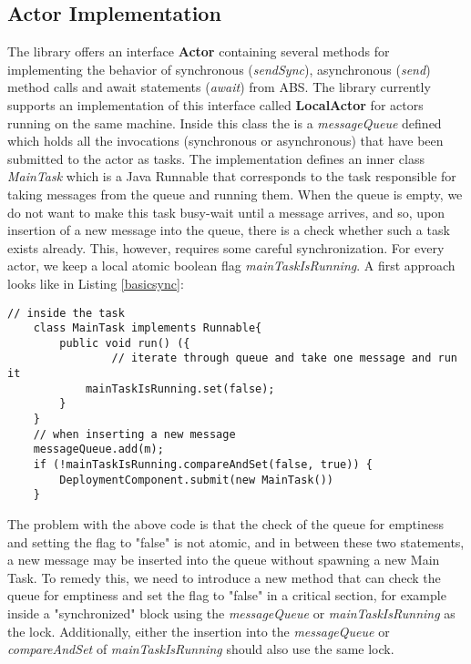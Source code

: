 \subsection{Actor Implementation}
The library offers an interface \textbf{Actor} containing several methods for implementing the behavior of synchronous (\textit{sendSync}), asynchronous (\textit{send}) method calls and await statements (\textit{await}) from ABS. The library currently supports an implementation of this interface called \textbf{LocalActor} for actors running on the same machine. Inside this class the is a \textit{messageQueue} defined which holds all the invocations (synchronous or asynchronous) that have been submitted to the actor as tasks. The implementation defines an inner class \textit{MainTask} which is a Java Runnable that corresponds to the task responsible for taking messages from the queue and running them. When the queue is empty, we do not want to make this task busy-wait until a message arrives, and so, upon insertion of a new message into the queue, there is a check whether such a task exists already. This, however, requires some careful synchronization. For every actor, we keep a local atomic boolean flag \textit{mainTaskIsRunning}. A first approach looks like in Listing \ref{basicsync}:

\begin{lstlisting}[caption= Basic Synchronization for the Demand-Driven Approach, label=basicsync]
	// inside the task
	class MainTask implements Runnable{
		public void run() ({
				// iterate through queue and take one message and run it
			mainTaskIsRunning.set(false);
		}
	}
	// when inserting a new message
	messageQueue.add(m);
	if (!mainTaskIsRunning.compareAndSet(false, true)) {
		DeploymentComponent.submit(new MainTask())
	}
\end{lstlisting}

The problem with the above code is that the check of the queue for emptiness and setting the flag to "false" is not atomic, and in between these two statements, a new message may be inserted into the queue without spawning a new Main Task. To remedy this, we need to introduce a new method that can check the queue for emptiness and set the flag to "false" in a critical section, for example inside a "synchronized" block using the \textit{messageQueue} or \textit{mainTaskIsRunning} as the lock. Additionally, either the insertion into the \textit{messageQueue} or \textit{compareAndSet} of \textit{mainTaskIsRunning} should also use the same lock.

